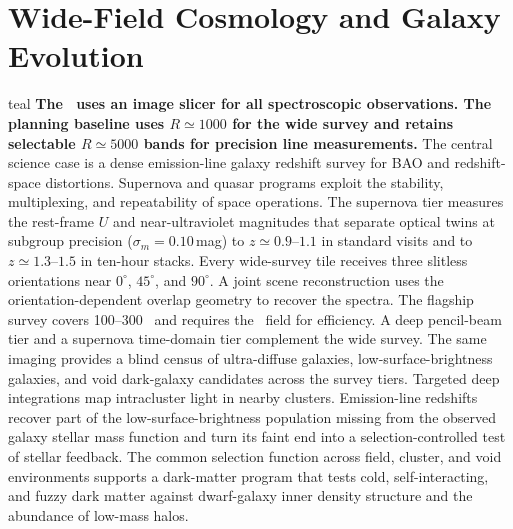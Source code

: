 \chapter{Wide-Field Cosmology and Galaxy Evolution}\label{app:cosmology}

\begin{leadbox}[title=Executive Summary]{teal}
\textbf{The \facility\ uses an image slicer for all spectroscopic observations. The planning baseline uses $R\simeq1000$ for the wide survey and retains selectable $R\simeq5000$ bands for precision line measurements.}
The central science case is a dense emission-line galaxy redshift survey for BAO and redshift-space distortions. Supernova and quasar programs exploit the stability, multiplexing, and repeatability of space operations. The supernova tier measures the rest-frame $U$ and near-ultraviolet magnitudes that separate optical twins at subgroup precision ($\sigma_m=0.10$\,mag) to $z\simeq0.9$--$1.1$ in standard visits and to $z\simeq1.3$--$1.5$ in ten-hour stacks. Every wide-survey tile receives three slitless orientations near $0^\circ$, $45^\circ$, and $90^\circ$. A joint scene reconstruction uses the orientation-dependent overlap geometry to recover the spectra. The flagship survey covers 100--300 \degti\ and requires the \fovlarge\ field for efficiency. A deep pencil-beam tier and a supernova time-domain tier complement the wide survey. The same imaging provides a blind census of ultra-diffuse galaxies, low-surface-brightness galaxies, and void dark-galaxy candidates across the survey tiers. Targeted deep integrations map intracluster light in nearby clusters. Emission-line redshifts recover part of the low-surface-brightness population missing from the observed galaxy stellar mass function and turn its faint end into a selection-controlled test of stellar feedback. The common selection function across field, cluster, and void environments supports a dark-matter program that tests cold, self-interacting, and fuzzy dark matter against dwarf-galaxy inner density structure and the abundance of low-mass halos.
\end{leadbox}

\vspace{2mm}
\begin{center}
\end{center}

